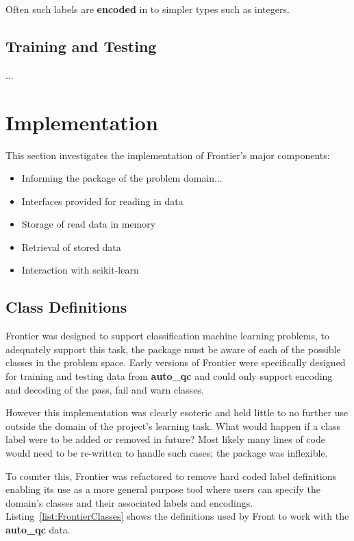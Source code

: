 Often such labels are \textbf{encoded} in to simpler types such as integers.


\subsection{Training and Testing}

...

\section{Implementation}

This section investigates the implementation of Frontier's major components:

\begin{itemize}
    \item Informing the package of the problem domain...
    \item Interfaces provided for reading in data
    \item Storage of read data in memory
    \item Retrieval of stored data
    \item Interaction with scikit-learn
\end{itemize}


\subsection{Class Definitions}
\label{chap:classes}

Frontier was designed to support classification machine learning problems, to
adequately support this task, the package must be aware of each of the possible
classes in the problem space. Early versions of Frontier were specifically
designed for training and testing data from \textbf{auto\_qc} and could only
support encoding and decoding of the pass, fail and warn classes.

However this implementation was clearly esoteric and held little to no further
use outside the domain of the project's learning task. What would happen if a
class label were to be added or removed in future? Most likely many lines of
code would need to be re-written to handle such cases; the package was
inflexible.

To counter this, Frontier was refactored to remove hard coded label definitions
enabling its use as a more general purpose tool where users can specify the
domain's classes and their associated labels and encodings.
Listing~\ref{list:FrontierClasses} shows the definitions used by Front to work
with the \textbf{auto\_qc} data.

